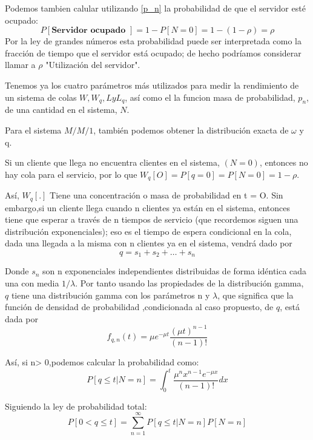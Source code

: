 \documentclass[a4paper,10pt]{scrartcl}
\theoremstyle{definition}
\theoremstyle{definition}
\numberwithin{equation}{section}
\begin{document}
	Podemos tambien calular utilizando \ref{p_n} la probabilidad de que el servidor esté ocupado:
	\begin{equation*}
	P[\textbf{Servidor ocupado }]=1-P[N=0]=1-(1-\rho)=\rho
	\end{equation*}
	Por la ley de grandes números esta probabilidad puede ser interpretada como la fracción de tiempo que el 
	servidor está ocupado; de hecho podríamos considerar llamar a $\rho$ "Utilización del servidor".
	
	Tenemos ya los cuatro parámetros más utilizados para medir la rendimiento de un sistema de colas 
	$W, W_q, L y L_q$, así como el la funcion masa de probabilidad, $p_n$, de una cantidad en el sistema, $N$. 
	
	Para el sistema $M / M / 1$, también podemos obtener la distribución exacta de $\omega$ y q.
	
	Si un cliente que llega no encuentra clientes en el sistema, $(N = 0)$, entonces no hay cola para el 
	servicio, por lo que $W_q [O] = P [q = 0] = P [N = 0] = 1 - \rho$.
	
	Así, $W_q [.]$ Tiene una concentración o masa de probabilidad en t = O. 
	Sin embargo,si un cliente llega cuando n clientes ya están en el sistema, entonces tiene que esperar a
	través de n tiempos de servicio (que recordemos siguen una distribución exponenciales); eso es el tiempo
	de espera condicional en la cola, dada una llegada a la misma con n clientes ya en el sistema, vendrá dado por
	\[q = s_1 + s_2 + \dots + s_n\]
	
	Donde $s_n$ son n exponenciales independientes distribuidas de forma idéntica cada una con media $1 / \lambda$.  Por tanto usando las propiedades de la distribución gamma, $q$ tiene una distribución gamma con los parámetros n y $\lambda$, que significa que la función de densidad de probabilidad ,condicionada al caso propuesto, de $q$, está dada por
	\begin{equation*}
	f_{q,n}(t)=\mu e^{-\mu t} \frac{(\mu t)^{n-1}}{(n-1)!}
	\end{equation*}
	
	Así, si n> 0,podemos calcular la probabilidad como:
	\begin{equation*}
	P[q\leq t|N=n]=\int_{0}^{t}\frac{\mu^nx^{n-1}e^{-\mu x}}{(n-1)!}dx
	\end{equation*}
	
	Siguiendo la ley de probabilidad total:
	\begin{equation*}
	P[0<q\leq t]=\sum_{n=1}^{\infty}P[q\leq t|N=n]P[N=n]
	\end{equation*}
	
\end{document}
